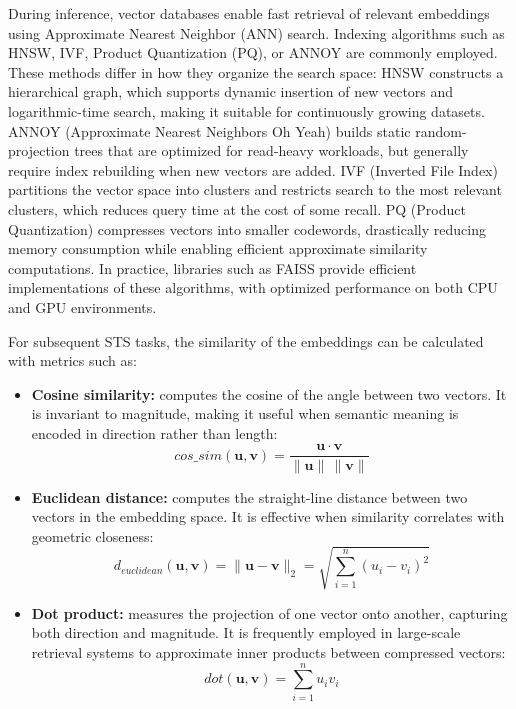 During inference, vector databases enable fast retrieval of relevant embeddings using Approximate Nearest Neighbor (\ac{ANN}) search. 
Indexing algorithms such as \ac{HNSW}, IVF, Product Quantization (PQ), or ANNOY are commonly employed. 
These methods differ in how they organize the search space: 
\ac{HNSW} constructs a hierarchical graph, which supports dynamic insertion of new vectors and logarithmic-time search, making it suitable for continuously growing datasets. 
ANNOY (Approximate Nearest Neighbors Oh Yeah) builds static random-projection trees that are optimized for read-heavy workloads, but generally require index rebuilding when new vectors are added. 
IVF (Inverted File Index) partitions the vector space into clusters and restricts search to the most relevant clusters, which reduces query time at the cost of some recall. 
PQ (Product Quantization) compresses vectors into smaller codewords, drastically reducing memory consumption while enabling efficient approximate similarity computations. 
In practice, libraries such as FAISS provide efficient implementations of these algorithms, with optimized performance on both CPU and GPU environments.


For subsequent \ac{STS} tasks, the similarity of the embeddings can be calculated with metrics such as:

\begin{itemize}
    \item \textbf{Cosine similarity:} computes the cosine of the angle between two vectors. It is invariant to magnitude, making it useful when semantic meaning is encoded in direction rather than length:  
    \[
        \textit{cos\_sim}(\mathbf{u}, \mathbf{v}) = \frac{\mathbf{u} \cdot \mathbf{v}}{\|\mathbf{u}\| \, \|\mathbf{v}\|}
    \]
    
    \item \textbf{Euclidean distance:} computes the straight-line distance between two vectors in the embedding space. It is effective when similarity correlates with geometric closeness:  
    \[
        d_{\textit{euclidean}}(\mathbf{u}, \mathbf{v}) = \|\mathbf{u} - \mathbf{v}\|_2 = \sqrt{\sum_{i=1}^n (u_i - v_i)^2}
    \]
    
    \item \textbf{Dot product:} measures the projection of one vector onto another, capturing both direction and magnitude. It is frequently employed in large-scale retrieval systems to approximate inner products between compressed vectors:  
    \[
        \textit{dot}(\mathbf{u}, \mathbf{v}) = \sum_{i=1}^n u_i v_i
    \]
\end{itemize}


